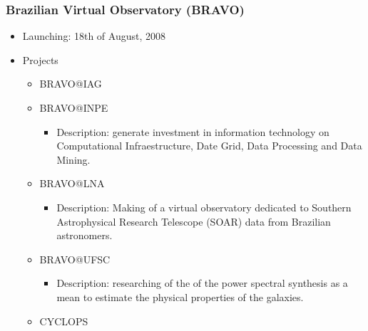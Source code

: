 \documentclass[11pt]{article}
\begin{document}
              \subsubsection{Brazilian Virtual Observatory (BRAVO)}
                  \begin{itemize}
                      \item Launching: 18th of August, 2008
                      \item Projects
                         \begin{itemize}
                             \item BRAVO@IAG
                             \item BRAVO@INPE
                                  \begin{itemize}
                                      \item Description: generate investment in
information technology on Computational Infraestructure, Date Grid, Data
Processing and Data Mining.
                                      \end{itemize}
                             \item BRAVO@LNA
                                  \begin{itemize}
                                      \item Description: Making of a virtual
observatory dedicated to Southern Astrophysical Research Telescope (SOAR) data
from Brazilian astronomers.
                                  \end{itemize}
                             \item BRAVO@UFSC
                                  \begin{itemize}
                                      \item Description: researching of the of
the power spectral synthesis as a mean to estimate the physical properties of
the galaxies.
                                  \end{itemize}
                             \item CYCLOPS
                         \end{itemize}
                  \end{itemize}
\end{document}
